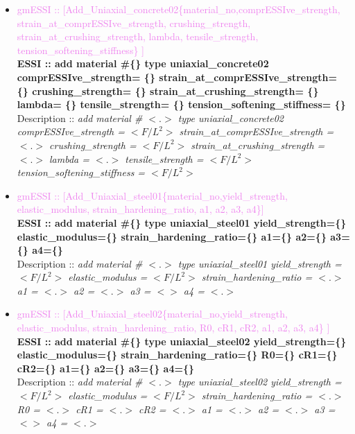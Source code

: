 \documentclass[11pt]{article}
\begin{document}
\begin{itemize}
      \item \textcolor{violet}{gmESSI :: [Add\_Uniaxial\_concrete02\{material\_no,comprESSIve\_strength, strain\_at\_comprESSIve\_strength, crushing\_strength, strain\_at\_crushing\_strength, lambda, tensile\_strength, tension\_softening\_stiffness\} ]}\\
      \textbf{ESSI :: add material \#\{\} type uniaxial\_concrete02 comprESSIve\_strength= \{\} strain\_at\_comprESSIve\_strength= \{\} crushing\_strength= \{\}  strain\_at\_crushing\_strength= \{\} lambda= \{\} tensile\_strength= \{\} tension\_softening\_stiffness= \{\} }\\
      Description ::  \textit{ add material \# $<.>$ type uniaxial\_concrete02 comprESSIve\_strength = $<F/L^2>$ strain\_at\_comprESSIve\_strength = $<.>$ crushing\_strength = $<F/L^2>$  strain\_at\_crushing\_strength = $<.>$ lambda = $<.>$ tensile\_strength = $<F/L^2>$ tension\_softening\_stiffness = $<F/L^2>$} 

      \item \textcolor{violet}{gmESSI :: [Add\_Uniaxial\_steel01\{material\_no,yield\_strength, elastic\_modulus, strain\_hardening\_ratio, a1, a2, a3, a4\}]}\\
      \textbf{ESSI :: add material \#\{\} type uniaxial\_steel01 yield\_strength=\{\} elastic\_modulus=\{\} strain\_hardening\_ratio=\{\} a1=\{\} a2=\{\} a3=\{\} a4=\{\} }\\
      Description ::  \textit{ add material \# $<.>$ type uniaxial\_steel01 yield\_strength = $<F/L^2>$ elastic\_modulus = $<F/L^2>$ strain\_hardening\_ratio = $<.>$  a1 = $<.>$  a2 = $<.>$  a3 = $<>$  a4 = $<.>$ } 

      \item \textcolor{violet}{gmESSI :: [Add\_Uniaxial\_steel02\{material\_no,yield\_strength, elastic\_modulus, strain\_hardening\_ratio, R0, cR1, cR2, a1, a2, a3, a4\} ]}\\
      \textbf{ESSI :: add material \#\{\} type uniaxial\_steel02 yield\_strength=\{\} elastic\_modulus=\{\} strain\_hardening\_ratio=\{\} R0=\{\} cR1=\{\} cR2=\{\} a1=\{\} a2=\{\} a3=\{\} a4=\{\} }\\
      Description ::  \textit{ add material \# $<.>$ type uniaxial\_steel02 yield\_strength = $<F/L^2>$ elastic\_modulus = $<F/L^2>$ strain\_hardening\_ratio = $<.>$ R0 = $<.>$ cR1 = $<.>$ cR2 = $<.>$  a1 = $<.>$  a2 = $<.>$  a3 = $<>$  a4 = $<.>$ } 


\end{itemize}
\end{document}

